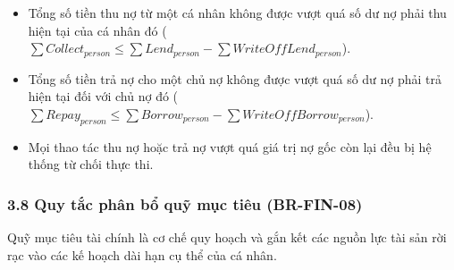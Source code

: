 \documentclass[11pt,a4paper]{article}
\providecommand{\tightlist}{
  \setlength{\itemsep}{0pt}\setlength{\parskip}{0pt}}
\begin{document}
\begin{enumerate}
  \begin{itemize}
  \tightlist
  \item
    Tổng số tiền thu nợ từ một cá nhân không được vượt quá số dư nợ phải
    thu hiện tại của cá nhân đó
    (\(\sum Collect_{person} \le \sum Lend_{person} - \sum WriteOffLend_{person}\)).
  \item
    Tổng số tiền trả nợ cho một chủ nợ không được vượt quá số dư nợ phải
    trả hiện tại đối với chủ nợ đó
    (\(\sum Repay_{person} \le \sum Borrow_{person} - \sum WriteOffBorrow_{person}\)).
  \item
    Mọi thao tác thu nợ hoặc trả nợ vượt quá giá trị nợ gốc còn lại đều
    bị hệ thống từ chối thực thi.
  \end{itemize}
\end{enumerate}

\subsubsection{3.8 Quy tắc phân bổ quỹ mục tiêu
(BR-FIN-08)}\label{38-quy-tux1eafc-phuxe2n-bux1ed5-quux1ef9-mux1ee5c-tiuxeau-br-fin-08}

Quỹ mục tiêu tài chính là cơ chế quy hoạch và gắn kết các nguồn lực tài
sản rời rạc vào các kế hoạch dài hạn cụ thể của cá nhân.
\end{document}
